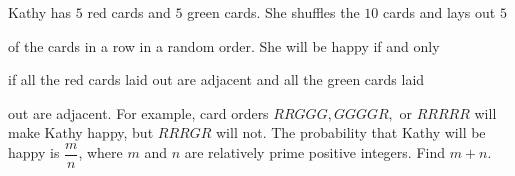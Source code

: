 Kathy has \(5\) red cards and \(5\) green cards. She shuffles the \(10\) cards and lays out \(5\)

 of the cards in a row in a random order. She will be happy if and only 

if all the red cards laid out are adjacent and all the green cards laid 

out are adjacent. For example, card orders \(RRGGG, GGGGR,\) or \(RRRRR\) will make Kathy happy, but \(RRRGR\) will not. The probability that Kathy will be happy is \( \dfrac{m}{n}\),  where \(m\) and \(n\) are relatively prime positive integers. Find \(m + n\).